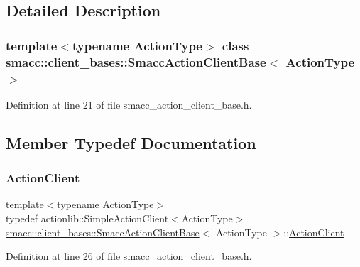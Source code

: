 \subsection{Detailed Description}
\subsubsection*{template$<$typename Action\+Type$>$\newline
class smacc\+::client\+\_\+bases\+::\+Smacc\+Action\+Client\+Base$<$ Action\+Type $>$}



Definition at line 21 of file smacc\+\_\+action\+\_\+client\+\_\+base.\+h.



\subsection{Member Typedef Documentation}
\mbox{\label{classsmacc_1_1client__bases_1_1SmaccActionClientBase_ab4cb0717885b95d577f82f4133db7f5f}} 
\subsubsection{\texorpdfstring{Action\+Client}{ActionClient}}
{\footnotesize\ttfamily template$<$typename Action\+Type$>$ \\
typedef actionlib\+::\+Simple\+Action\+Client$<$Action\+Type$>$ \hyperlink{classsmacc_1_1client__bases_1_1SmaccActionClientBase}{smacc\+::client\+\_\+bases\+::\+Smacc\+Action\+Client\+Base}$<$ Action\+Type $>$\+::\hyperlink{classsmacc_1_1client__bases_1_1SmaccActionClientBase_ab4cb0717885b95d577f82f4133db7f5f}{Action\+Client}}



Definition at line 26 of file smacc\+\_\+action\+\_\+client\+\_\+base.\+h.

\mbox{\label{classsmacc_1_1client__bases_1_1SmaccActionClientBase_a43e1a844615218b95151d456eb32b835}} 

